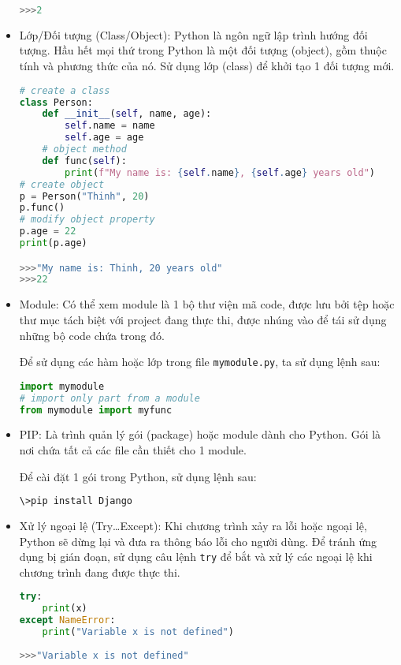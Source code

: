 \begin{itemize}
\begin{lstlisting}[language=Python]
>>>2
	\end{lstlisting}
	\item Lớp/Đối tượng (Class/Object): Python là ngôn ngữ lập trình hướng đối tượng. Hầu hết mọi thứ trong Python là một đối tượng (object), gồm thuộc tính và phương thức của nó. Sử dụng lớp (class) để khởi tạo 1 đối tượng mới.
	\begin{lstlisting}[language=Python]
# create a class
class Person:
	def __init__(self, name, age):
		self.name = name
		self.age = age
	# object method
	def func(self):
		print(f"My name is: {self.name}, {self.age} years old")
# create object
p = Person("Thinh", 20)
p.func()
# modify object property
p.age = 22
print(p.age)

>>>"My name is: Thinh, 20 years old"
>>>22
	\end{lstlisting}
	\item Module: Có thể xem module là 1 bộ thư viện mã code, được lưu bởi tệp hoặc thư mục tách biệt với project đang thực thi, được nhúng vào để tái sử dụng những bộ code chứa trong đó.
	\par
	Để sử dụng các hàm hoặc lớp trong file \texttt{mymodule.py}, ta sử dụng lệnh sau:
	\begin{lstlisting}[language=Python]
import mymodule
# import only part from a module
from mymodule import myfunc
	\end{lstlisting}
	\item PIP: Là trình quản lý gói (package) hoặc module dành cho Python. Gói là nơi chứa tất cả các file cần thiết cho 1 module.
	\par
	Để cài đặt 1 gói trong Python, sử dụng lệnh sau:
	\begin{lstlisting}[language=bash]
\>pip install Django
	\end{lstlisting}
	\item Xử lý ngoại lệ (Try\ldots Except): Khi chương trình xảy ra lỗi hoặc ngoại lệ, Python sẽ dừng lại và đưa ra thông báo lỗi cho người dùng. Để tránh ứng dụng bị gián đoạn, sử dụng câu lệnh \texttt{try} để bắt và xử lý các ngoại lệ khi chương trình đang được thực thi.
	\begin{lstlisting}[language=Python]
try:
	print(x)
except NameError:
	print("Variable x is not defined")
	
>>>"Variable x is not defined"
	\end{lstlisting}
\end{itemize}
